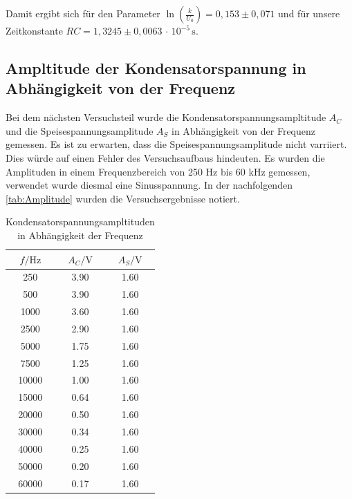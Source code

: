 Damit ergibt sich für den Parameter $\ln{\left(\frac{k}{U_0}\right)}=0{,}153 \pm 0{,}071$ und für unsere Zeitkonstante $RC = 1{,}3245 \pm 0{,}0063 \, \cdot \, 10^{-5} \, \unit{\second}$.

\subsection{Ampltitude der Kondensatorspannung in Abhängigkeit von der Frequenz}

Bei dem nächsten Versuchsteil wurde die Kondensatorspannungsampltitude $A_C$ und die Speisespannungsamplitude $A_S$ in Abhängigkeit von der 
Frequenz gemessen. Es ist zu erwarten, dass die Speisespannungsamplitude nicht varriiert. Dies würde auf einen Fehler des Versuchsaufbaus hindeuten.
Es wurden die Amplituden in einem Frequenzbereich von 250 Hz bis 60 kHz gemessen, verwendet wurde diesmal eine Sinusspannung. In der nachfolgenden 
\autoref{tab:Amplitude} wurden die Versuchsergebnisse notiert.

\begin{table}
  \centering
  \caption{Kondensatorspannungsampltituden in Abhängigkeit der Frequenz}
  \label{tab:Amplitude}
  \begin{tabular}{c c c}
    \toprule
    $f/\unit{\hertz}$ & $A_C/\unit{\volt}$ & $A_S/\unit{\volt}$ \\
    \midrule      
    250    &   3.90  &   1.60   \\      
    500    &   3.90  &   1.60     \\    
   1000    &   3.60  &   1.60      \\   
   2500    &   2.90  &   1.60        \\ 
   5000    &   1.75  &   1.60         \\
   7500    &   1.25  &   1.60         \\
  10000    &   1.00  &   1.60         \\
  15000    &   0.64  &   1.60        \\
  20000    &   0.50  &   1.60         \\
  30000    &   0.34  &   1.60         \\
  40000    &   0.25  &   1.60         \\
  50000    &   0.20  &   1.60         \\
  60000    &   0.17  &   1.60         \\
    \bottomrule
  \end{tabular}
\end{table}
